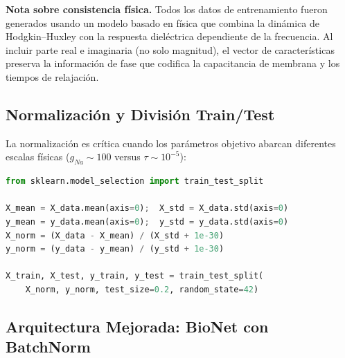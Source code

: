 \documentclass[12pt]{article}
\begin{document}
\noindent\textbf{Nota sobre consistencia f\'isica.} Todos los datos de entrenamiento fueron
generados usando un modelo basado en f\'isica que combina la din\'amica de Hodgkin--Huxley
con la respuesta diel\'ectrica dependiente de la frecuencia. Al incluir parte real e imaginaria
(no solo magnitud), el vector de caracter\'isticas preserva la informaci\'on de fase que codifica
la capacitancia de membrana y los tiempos de relajaci\'on.

\subsection{Normalizaci\'on y Divisi\'on Train/Test}

La normalizaci\'on es cr\'itica cuando los par\'ametros objetivo abarcan diferentes escalas
f\'isicas ($g_{Na} \sim 100$ versus $\tau \sim 10^{-5}$):

\begin{lstlisting}[language=Python, caption={Normalizaci\'on z-score y divisi\'on 80/20 train/test.}]
from sklearn.model_selection import train_test_split

X_mean = X_data.mean(axis=0);  X_std = X_data.std(axis=0)
y_mean = y_data.mean(axis=0);  y_std = y_data.std(axis=0)
X_norm = (X_data - X_mean) / (X_std + 1e-30)
y_norm = (y_data - y_mean) / (y_std + 1e-30)

X_train, X_test, y_train, y_test = train_test_split(
    X_norm, y_norm, test_size=0.2, random_state=42)
\end{lstlisting}

\subsection{Arquitectura Mejorada: BioNet con BatchNorm}
\end{document}
